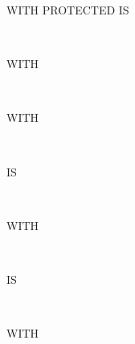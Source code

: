 \begin{syntax}[\miscextcolour]
  \begin{0-1}
    WITH PROTECTED  IS
    \begin{1=}
      \identifier \\
      \integer
    \end{1=}
  \end{0-1}

  \begin{0-1}
    WITH
    \begin{1=}
       \\
    \end{1=}
  \end{0-1}

  \begin{0-1}
    WITH
    \begin{1=}
       \\
    \end{1=}
    IS
    \begin{1=}
      \identifier \\
      \integer
    \end{1=}
  \end{0-1}

  \begin{0-1}
    WITH
    \begin{1=}
       \\
    \end{1=}
    IS
    \begin{1=}
      \identifier \\
      \integer
    \end{1=}
  \end{0-1}

  \begin{0-1}
    WITH 
    \begin{1=}
       \\
    \end{1=}
    \begin{0-1}
      \begin{1=}
        \identifier \\
        \integer
      \end{1=}
      \begin{1=}
         \\
      \end{1=}
    \end{0-1}
  \end{0-1}
\end{syntax}

